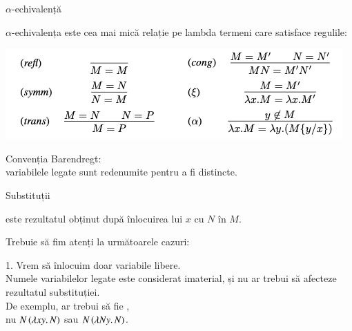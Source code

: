 \documentclass[xcolor=pdftex,romanian,colorlinks]{beamer}
\begin{document}

\begin{frame}[fragile]{$\alpha$-echivalență}

$\alpha$-echivalența \intens{$=_\alpha$} este cea mai mică relație pe lambda termeni care satisface regulile:

\begin{center}
\includegraphics[scale=.6]{images/alpha-equiv}
\end{center}

\alert{Convenția Barendregt:} \\ variabilele legate sunt redenumite pentru a fi distincte.
\end{frame}



\begin{frame}[fragile]{Substituții}



\smallskip
{} este rezultatul obținut după înlocuirea lui $x$ cu $N$ în $M$.

\smallskip
Trebuie să fim atenți la următoarele cazuri:

\alert{1. Vrem să înlocuim doar variabile libere.} \\
Numele variabilelor legate este considerat imaterial, și nu ar trebui să afecteze rezultatul substituției. \\
De exemplu,  ar trebui să fie , \\ nu {\color{red} $N\, (\lambda xy.\,N)$} sau  {\color{red} $N\, (\lambda Ny.\,N)$}.

\end{frame}

\end{document}
